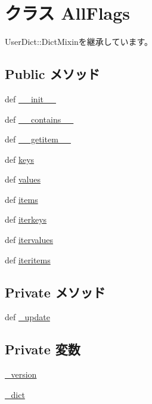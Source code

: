 \hypertarget{classm5_1_1debug_1_1AllFlags}{
\section{クラス AllFlags}
\label{classm5_1_1debug_1_1AllFlags}
}


UserDict::DictMixinを継承しています。\subsection*{Public メソッド}
\begin{DoxyCompactItemize}
\item 
def \hyperlink{classm5_1_1debug_1_1AllFlags_ac775ee34451fdfa742b318538164070e}{\_\-\_\-init\_\-\_\-}
\item 
def \hyperlink{classm5_1_1debug_1_1AllFlags_a31ecdf34e79a47aea99a17eea32b7ac2}{\_\-\_\-contains\_\-\_\-}
\item 
def \hyperlink{classm5_1_1debug_1_1AllFlags_a50d766f4276c3d8fe330ac8cd344a75f}{\_\-\_\-getitem\_\-\_\-}
\item 
def \hyperlink{classm5_1_1debug_1_1AllFlags_aeb7ba70a3c91eced4f8d49ac5dc0c398}{keys}
\item 
def \hyperlink{classm5_1_1debug_1_1AllFlags_abb73a0060caeba53780d972f37623f1e}{values}
\item 
def \hyperlink{classm5_1_1debug_1_1AllFlags_a717291221885735d6870d7179083ec07}{items}
\item 
def \hyperlink{classm5_1_1debug_1_1AllFlags_a44560b0b40dfcd2069b980760783cc7b}{iterkeys}
\item 
def \hyperlink{classm5_1_1debug_1_1AllFlags_aeb6e8630a10560ad0d4b34377c790f19}{itervalues}
\item 
def \hyperlink{classm5_1_1debug_1_1AllFlags_a13d39839ad1cfd4c47f524735933c0bf}{iteritems}
\end{DoxyCompactItemize}
\subsection*{Private メソッド}
\begin{DoxyCompactItemize}
\item 
def \hyperlink{classm5_1_1debug_1_1AllFlags_a5186eac54b97bf19735a67d9652f424c}{\_\-update}
\end{DoxyCompactItemize}
\subsection*{Private 変数}
\begin{DoxyCompactItemize}
\item 
\hyperlink{classm5_1_1debug_1_1AllFlags_aeeaa0c459069671087f2e77c5b65a76e}{\_\-version}
\item 
\hyperlink{classm5_1_1debug_1_1AllFlags_a4d2dd191e958f6b142f60e7f94ce0dd0}{\_\-dict}
\end{DoxyCompactItemize}


